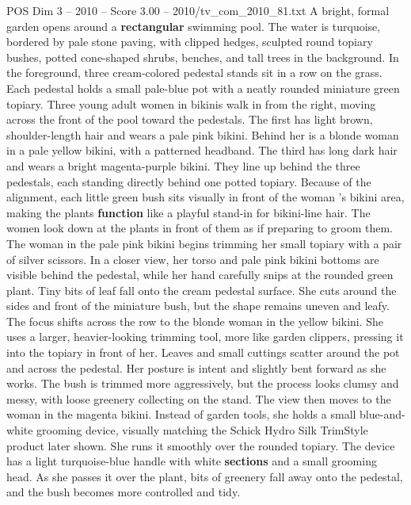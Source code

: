 \begin{textsample}{POS Dim 3 – 2010 – Score 3.00 – 2010/tv\_com\_2010\_81.txt}  \label{ex:f3_pos_089}
A bright, formal garden opens around a \textbf{rectangular} swimming pool.
The water is turquoise, bordered by pale stone paving, with clipped hedges, sculpted round topiary bushes, potted cone-shaped shrubs, benches, and tall trees in the background.
In the foreground, three cream-colored pedestal stands sit in a row on the grass.
Each pedestal holds a small pale-blue pot with a neatly rounded miniature green topiary.
Three young adult women in bikinis walk in from the right, moving across the front of the pool toward the pedestals.
The first has light brown, shoulder-length hair and wears a pale pink bikini.
Behind her is a blonde woman in a pale yellow bikini, with a patterned headband.
The third has long dark hair and wears a bright magenta-purple bikini.
They line up behind the three pedestals, each standing directly behind one potted topiary.
Because of the alignment, each little green bush sits visually in front of the woman ’s bikini area, making the plants \textbf{function} like a playful stand-in for bikini-line hair.
The women look down at the plants in front of them as if preparing to groom them.
The woman in the pale pink bikini begins trimming her small topiary with a pair of silver scissors.
In a closer view, her torso and pale pink bikini bottoms are visible behind the pedestal, while her hand carefully snips at the rounded green plant.
Tiny bits of leaf fall onto the cream pedestal surface.
She cuts around the sides and front of the miniature bush, but the shape remains uneven and leafy.
The focus shifts across the row to the blonde woman in the yellow bikini.
She uses a larger, heavier-looking trimming tool, more like garden clippers, pressing it into the topiary in front of her.
Leaves and small cuttings scatter around the pot and across the pedestal.
Her posture is intent and slightly bent forward as she works.
The bush is trimmed more aggressively, but the process looks clumsy and messy, with loose greenery collecting on the stand.
The view then moves to the woman in the magenta bikini.
Instead of garden tools, she holds a small blue-and-white grooming device, visually matching the Schick Hydro Silk TrimStyle product later shown.
She runs it smoothly over the rounded topiary.
The device has a light turquoise-blue handle with white \textbf{sections} and a small grooming head.
As she passes it over the plant, bits of greenery fall away onto the pedestal, and the bush becomes more controlled and tidy.

\end{textsample}
